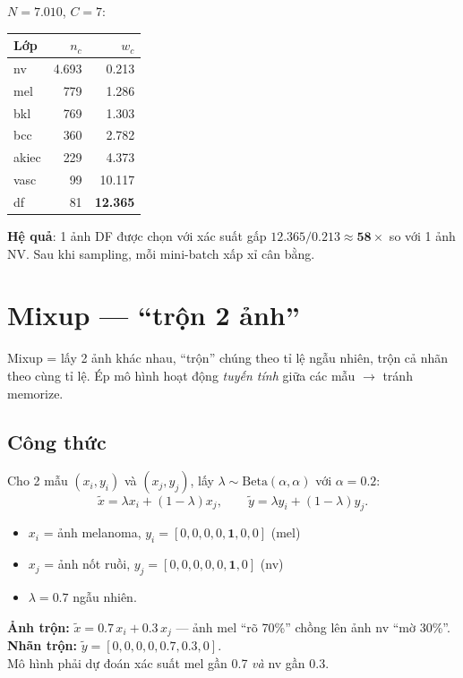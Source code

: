 \documentclass[11pt,a4paper]{article}
\begin{document}
\begin{example}
$N = 7.010$, $C = 7$:

\begin{center}\small
\begin{tabular}{lrr}
\toprule
Lớp & $n_c$ & $w_c$ \\
\midrule
nv   & 4.693 & 0.213 \\
mel  &   779 & 1.286 \\
bkl  &   769 & 1.303 \\
bcc  &   360 & 2.782 \\
akiec&   229 & 4.373 \\
vasc &    99 & 10.117 \\
df   &    81 & \textbf{12.365} \\
\bottomrule
\end{tabular}
\end{center}

\textbf{Hệ quả}: 1 ảnh DF được chọn với xác suất gấp $12.365 / 0.213 \approx \mathbf{58\times}$ so với 1 ảnh NV. Sau khi sampling, mỗi mini-batch xấp xỉ cân bằng.
\end{example}

\section{Mixup --- ``trộn 2 ảnh''}

\begin{simple}
Mixup = lấy 2 ảnh khác nhau, ``trộn'' chúng theo tỉ lệ ngẫu nhiên, trộn cả nhãn theo cùng tỉ lệ. Ép mô hình hoạt động \textit{tuyến tính} giữa các mẫu $\to$ tránh memorize.
\end{simple}

\subsection{Công thức}

Cho 2 mẫu $(x_i, y_i)$ và $(x_j, y_j)$, lấy $\lambda \sim \mathrm{Beta}(\alpha, \alpha)$ với $\alpha = 0.2$:
\[
  \tilde{x} = \lambda x_i + (1-\lambda) x_j, \qquad \tilde{y} = \lambda y_i + (1-\lambda) y_j.
\]

\begin{example}
\begin{itemize}[leftmargin=*]
  \item $x_i$ = ảnh melanoma, $y_i = [0,0,0,0,\mathbf{1},0,0]$ (mel)
  \item $x_j$ = ảnh nốt ruồi, $y_j = [0,0,0,0,0,\mathbf{1},0]$ (nv)
  \item $\lambda = 0.7$ ngẫu nhiên.
\end{itemize}
\textbf{Ảnh trộn:} $\tilde{x} = 0.7 \, x_i + 0.3 \, x_j$ --- ảnh mel ``rõ 70\%'' chồng lên ảnh nv ``mờ 30\%''.\\
\textbf{Nhãn trộn:} $\tilde{y} = [0,0,0,0, \mathbf{0.7}, \mathbf{0.3}, 0]$.\\
Mô hình phải dự đoán xác suất mel gần 0.7 \textit{và} nv gần 0.3.
\end{example}
\end{document}
